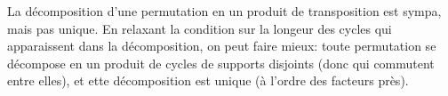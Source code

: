 \documentclass[french,course,oneside,theoremnosection]{lecture}
\newcommand{\N}{\mathbb{N}}
\newcommand{\Z}{\mathbb{Z}}
\begin{document}
La décomposition d'une permutation en un produit de transposition est sympa, mais pas unique. En relaxant la condition sur la longeur des cycles qui apparaissent dans la décomposition, on peut faire mieux:  toute permutation se décompose en un produit de cycles de supports disjoints (donc qui commutent entre elles), et ette décomposition est unique (à l'ordre des facteurs près).



\end{document}
